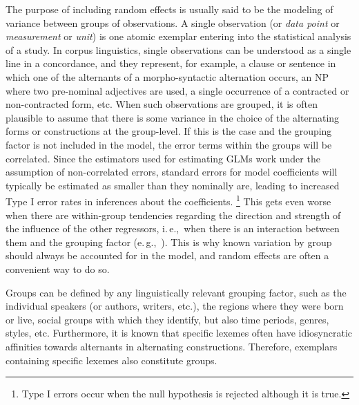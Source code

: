 \documentclass[a4paper,12pt]{article}
\newcommand{\ie}{i.\,e.,\ }
\newcommand{\eg}{e.\,g.,\ }
\begin{document}
The purpose of including random effects is usually said to be the modeling of variance between groups of observations.
A single observation (or \textit{data point} or \textit{measurement} or \textit{unit}) is one atomic exemplar entering into the statistical analysis of a study.
In corpus linguistics, single observations can be understood as a single line in a concordance, and they represent, for example, a clause or sentence in which one of the alternants of a morpho-syntactic alternation occurs, an NP where two pre-nominal adjectives are used, a single occurrence of a contracted or non-contracted form, etc.
When such observations are grouped, it is often plausible to assume that there is some variance in the choice of the alternating forms or constructions at the group-level.
If this is the case and the grouping factor is not included in the model, the error terms within the groups will be correlated.
Since the estimators used for estimating GLMs work under the assumption of non-correlated errors, standard errors for model coefficients will typically be estimated as smaller than they nominally are, leading to increased Type I error rates in inferences about the coefficients.%
\footnote{Type I errors occur when the null hypothesis is rejected although it is true.}
This gets even worse when there are within-group tendencies regarding the direction and strength of the influence of the other regressors, \ie when there is an interaction between them and the grouping factor (\eg \citealt{SchielzethForstmeier2009}).
This is why known variation by group should always be accounted for in the model, and random effects are often a convenient way to do so.

Groups can be defined by any linguistically relevant grouping factor, such as the individual speakers (or authors, writers, etc.), the regions where they were born or live, social groups with which they identify, but also time periods, genres, styles, etc.
Furthermore, it is known that specific lexemes often have idiosyncratic affinities towards alternants in alternating constructions.
Therefore, exemplars containing specific lexemes also constitute groups.
\end{document}
